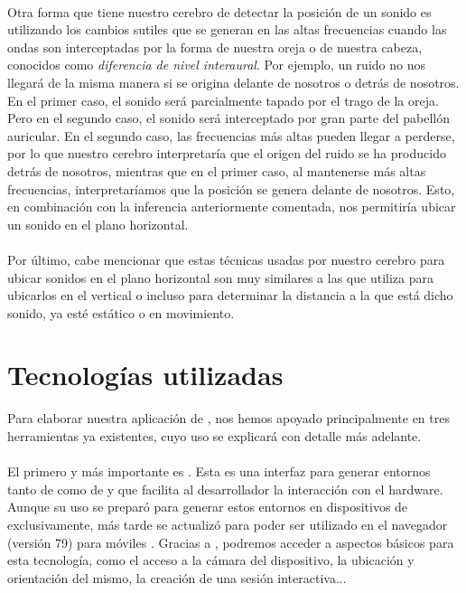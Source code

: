 \documentclass{subfiles}
\begin{document}
        \paragraph{}
        Otra forma que tiene nuestro cerebro de detectar la posición de un sonido es utilizando los cambios sutiles que se generan en las altas frecuencias cuando las ondas son interceptadas por la forma de nuestra oreja o de nuestra cabeza, conocidos como \textit{diferencia de nivel interaural}. Por ejemplo, un ruido no nos llegará de la misma manera si se origina delante de nosotros o detrás de nosotros. En el primer caso, el sonido será parcialmente tapado por el trago de la oreja. Pero en el segundo caso, el sonido será interceptado por gran parte del pabellón auricular. En el segundo caso, las frecuencias más altas pueden llegar a perderse, por lo que nuestro cerebro interpretaría que el origen del ruido se ha producido detrás de nosotros, mientras que en el primer caso, al mantenerse más altas frecuencias, interpretaríamos que la posición se genera delante de nosotros. Esto, en combinación con la inferencia anteriormente comentada, nos permitiría ubicar un sonido en el plano horizontal.

        \paragraph{}
        Por último, cabe mencionar que estas técnicas usadas por nuestro cerebro para ubicar sonidos en el plano horizontal son muy similares a las que utiliza para ubicarlos en el vertical o incluso para determinar la distancia a la que está dicho sonido, ya esté estático o en movimiento.
        
        \section{Tecnologías utilizadas}
        \label{sec:1.5}

        Para elaborar nuestra aplicación de \ra, nos hemos apoyado principalmente en tres herramientas ya existentes, cuyo uso se explicará con detalle más adelante.

        \paragraph{}
        El primero y más importante es \webxr \cite{web:webxr}. Esta es una interfaz para generar entornos tanto de \ra como de \rv y que facilita al desarrollador la interacción con el hardware. Aunque su uso se preparó para generar estos entornos en dispositivos de \rv exclusivamente, más tarde se actualizó para poder ser utilizado en el navegador \googlechrome (versión 79) para móviles \android. Gracias a \webxr, podremos acceder a aspectos básicos para esta tecnología, como el acceso a la cámara del dispositivo, la ubicación y orientación del mismo, la creación de una sesión interactiva...
\end{document}
